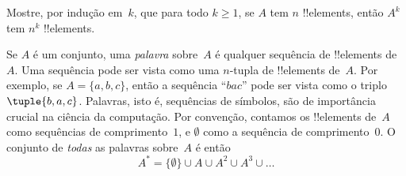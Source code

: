 \documentclass[../../../include/open-logic-section]{subfiles}
\begin{document}
\begin{prob}
Mostre, por indução em~$k$, que para todo $k \ge 1$, se $A$ tem $n$
!!{element}s, então $A^k$ tem $n^k$ !!{element}s.
\end{prob}

\begin{ex}
Se $A$ é um conjunto, uma \emph{palavra} sobre~$A$ é qualquer sequência de
!!{element}s de~$A$. Uma sequência pode ser vista como uma $n$-tupla de
!!{element}s de~$A$. Por exemplo, se $A = \{a, b, c\}$, então a
sequência ``$bac$'' pode ser vista como o triplo~$\tuple{b, a, c}$.
Palavras, isto é, sequências de símbolos, são de importância crucial na
ciência da computação. Por convenção, contamos os !!{element}s de~$A$ como
sequências de comprimento~$1$, e $\emptyset$ como a sequência de comprimento~$0$.
O conjunto de \emph{todas} as palavras sobre~$A$ é então
\[
A^* = \{\emptyset\} \cup A \cup A^2 \cup A^3 \cup \dots
\]
\end{ex}
\end{document}
